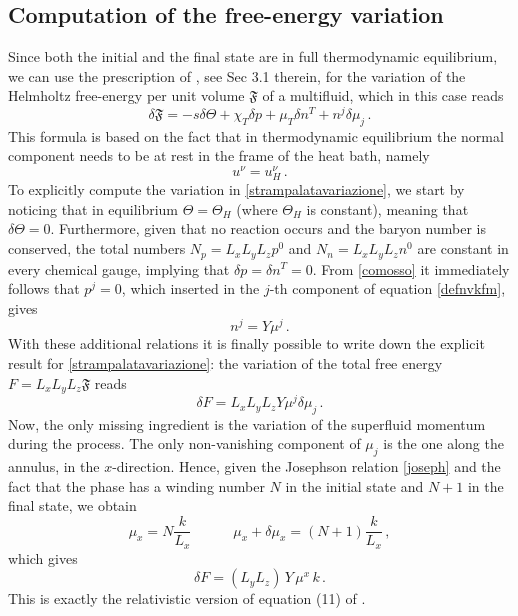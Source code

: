 \documentclass[preprints,article,accept,moreauthors,pdftex]{mdpi}
\newcommand{\spc}{\quad \quad \quad}
\begin{document}
\subsection{Computation of the free-energy variation}

Since both the initial and the final state are in full thermodynamic equilibrium, we can use the prescription of \cite{Termo}, see Sec 3.1 therein, for the variation of the Helmholtz free-energy per unit volume $\mathfrak{F}$ of a multifluid, which  in this case  reads
\begin{equation}
\label{strampalatavariazione}
\delta \mathfrak{F} = -s \delta \Theta + \chi_T \delta p + \mu_T \delta n^T + n^j \delta \mu_j \, .
\end{equation}
This formula is based on the fact that in thermodynamic equilibrium the normal component needs to be at rest in the frame of the heat bath, namely 
\begin{equation}\label{comosso}
u^\nu = u_H^\nu \, .
\end{equation}
To explicitly compute the variation in \eqref{strampalatavariazione}, we start by noticing that in equilibrium $\Theta = \Theta_H$ (where $\Theta_H$ is constant), meaning that $\delta \Theta =0$.
Furthermore, given that no reaction occurs and the baryon number is conserved, the total numbers $N_p = L_x L_y L_z p^0$ and $N_n = L_x L_y L_z n^0$ are constant in every chemical gauge, implying that $\delta p = \delta n^T =0$. From \eqref{comosso} it immediately follows that $p^j=0$, which inserted in the $j$-th component of equation \eqref{defnvkfm}, gives
\begin{equation}\label{nYjm}
n^j = Y \mu^j \, .
\end{equation}
With these additional relations it is finally possible to write down the explicit result for \eqref{strampalatavariazione}: the variation of the total free energy $F=L_x L_y L_z \mathfrak{F}$ reads
\begin{equation}
\delta F = L_x L_y L_z Y \mu^j \delta \mu_j \, . 
\end{equation}
Now, the only missing ingredient is the variation of the superfluid momentum during the process. 
The only non-vanishing component of $ \mu_j $ is the one along the annulus, in the $x$-direction. 
Hence, given the Josephson relation \eqref{joseph} and the fact that the phase has a winding number $N$ in the initial state and $N+1$ in the final state, we obtain
\begin{equation}
\mu_x = N \dfrac{k}{L_x}  \spc \mu_x + \delta \mu_x = (N+1) \dfrac{k}{L_x} \, ,
\end{equation}
which gives
\begin{equation}\label{deltaFFF}
\delta F =  ( L_y L_z) \, Y \, \mu^x \, k \, . 
\end{equation}
This is exactly the relativistic version of equation (11) of \citet{Wexler1997}.
\end{document}
